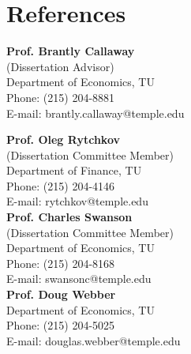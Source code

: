 \documentclass[letterpaper]{article}
\begin{document}
\section*{References}
\vspace{-.15in}
\begin{multicols}{2}
	
	\textbf{Prof. Brantly Callaway} \\
	(Dissertation Advisor)\\
	Department of Economics, TU \\
	\hfill {Phone: (215) 204-8881}\\
	\hfill{E-mail: {\color{blue}brantly.callaway@temple.edu}}
	
	\vspace{.2in}
	
	\textbf{Prof. Oleg Rytchkov}\\
	(Dissertation Committee Member)\\
	Department of Finance, TU\\
	\hfill Phone: (215) 204-4146\\
	\hfill{E-mail: {\color{blue}rytchkov@temple.edu}}\\

		\columnbreak
	\textbf{Prof. Charles Swanson} \\
		(Dissertation Committee Member)\\
	Department of Economics, TU \\
	\hfill {Phone: (215) 204-8168}\\
	\hfill{E-mail: {\color{blue}swansonc@temple.edu}}\\

	\textbf{Prof. Doug Webber} \\
	Department of Economics, TU \\
	\hfill{Phone: (215) 204-5025} \\
	\hfill{E-mail: {\color{blue}douglas.webber@temple.edu}}\\
	
%	
\end{multicols}
\end{document}
